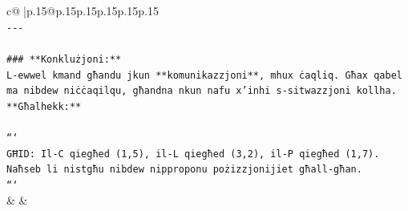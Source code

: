 \documentclass{article}
\begin{document}
{\begin{supertabular}{c@{$\;$}|p{.15\linewidth}@{}p{.15\linewidth}p{.15\linewidth}p{.15\linewidth}p{.15\linewidth}p{.15\linewidth}}
{{{\\ 
\texttt{{-}{-}{-}} \\
\\ 
\texttt{\#\#\# **Konklużjoni:**} \\
\texttt{L{-}ewwel kmand għandu jkun **komunikazzjoni**, mhux ċaqliq. Għax qabel ma nibdew niċċaqilqu, għandna nkun nafu x'inhi s{-}sitwazzjoni kollha. **Għalhekk:**} \\
\\ 
\texttt{```} \\
\texttt{GĦID: Il{-}C qiegħed (1,5), il{-}L qiegħed (3,2), il{-}P qiegħed (1,7). Naħseb li nistgħu nibdew nipproponu pożizzjonijiet għall{-}għan.} \\
\texttt{```} \\
            }
        }
    }
    & & \\ \\


\end{supertabular}}
\end{document}
